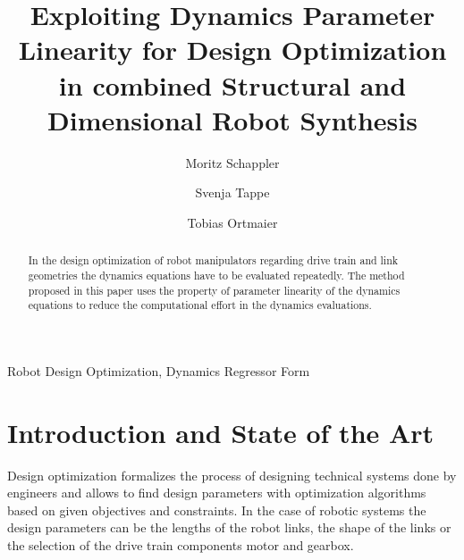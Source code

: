 \documentclass{svproc}
\begin{document}
    
\mainmatter              %
%
\title{Exploiting Dynamics Parameter Linearity for Design Optimization in combined Structural and Dimensional Robot Synthesis}
%
%
\author{Moritz Schappler \and Svenja Tappe \and Tobias Ortmaier}
%
%
%

\maketitle              %


\begin{abstract}
In the design optimization of robot manipulators regarding drive train and link geometries the dynamics equations have to be evaluated repeatedly.
The method proposed in this paper uses the property of parameter linearity of the dynamics equations to reduce the computational effort in the dynamics evaluations.
\end{abstract}

\begin{keywords}
Robot Design Optimization, Dynamics Regressor Form
\end{keywords}

\section{Introduction and State of the Art}
\label{sec:Intro}


Design optimization formalizes the process of designing technical systems done by engineers and allows to find design parameters with optimization algorithms based on given objectives and constraints.
In the case of robotic systems the design parameters can be the lengths of the robot links, the shape of the links or the selection of the drive train components motor and gearbox.
\end{document}
